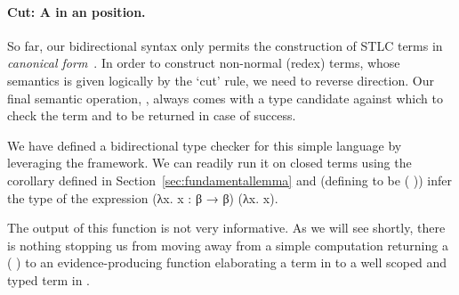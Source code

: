 \paragraph*{Cut: A  in an  position.}
So far, our bidirectional syntax only permits the construction
  of STLC terms in \emph{canonical
    form}~\cite{Pfenning:04,Dunfield:2004:TT:964001.964025}. In order to construct
  non-normal (redex) terms, whose semantics is given logically by the
  `cut' rule, we need to reverse direction.
Our final semantic operation, ,
always comes with a type candidate against which to check the term and
to be returned in case of success.
\begin{agdasnippet}
\end{agdasnippet}
%
We have defined a bidirectional type checker for this simple language by
leveraging the \semrec{} framework. We can readily run it on closed terms
using the  corollary defined in Section~\ref{sec:fundamentallemma}
and (defining  to be {(  )}) infer the type of
the expression {(λx. x : β → β) (λx. x)}.

\begin{agdasnippet}
\end{agdasnippet}

The output of this function is not very informative. As we will see shortly,
there is nothing stopping us from moving away from a simple computation
returning a {( )} to an evidence-producing function
elaborating a term in  to a well scoped and typed term in .
